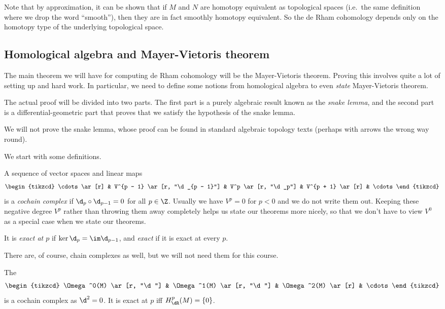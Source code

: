 \documentclass[a4paper]{article}
\begin{document}
Note that by approximation, it can be shown that if $M$ and $N$ are homotopy equivalent as topological spaces (i.e.\ the same definition where we drop the word ``smooth''), then they are in fact smoothly homotopy equivalent. So the de Rham cohomology depends only on the homotopy type of the underlying topological space.

\subsection{Homological algebra and Mayer-Vietoris theorem}
The main theorem we will have for computing de Rham cohomology will be the Mayer-Vietoris theorem. Proving this involves quite a lot of setting up and hard work. In particular, we need to define some notions from homological algebra to even \emph{state} Mayer-Vietoris theorem.

The actual proof will be divided into two parts. The first part is a purely algebraic result known as the \emph{snake lemma}, and the second part is a differential-geometric part that proves that we satisfy the hypothesis of the snake lemma.

We will not prove the snake lemma, whose proof can be found in standard algebraic topology texts (perhaps with arrows the wrong way round). %

We start with some definitions.
\begin{defi}
  A sequence of vector spaces and linear maps
  \[
    \begin{tikzcd}
      \cdots \ar[r] & V^{p - 1} \ar[r, "\d_{p - 1}"] & V^p \ar[r, "\d_p"] & V^{p + 1} \ar[r] & \cdots
    \end{tikzcd}
  \]
  is a \emph{cochain complex} if $\d_p \circ \d_{p - 1} = 0$ for all $p \in \Z$. Usually we have $V^p = 0$ for $p < 0$ and we do not write them out. Keeping these negative degree $V^p$ rather than throwing them away completely helps us state our theorems more nicely, so that we don't have to view $V^0$ as a special case when we state our theorems.

  It is \emph{exact at $p$} if $\ker \d_p = \im \d_{p - 1}$, and \emph{exact} if it is exact at every $p$.
\end{defi}
There are, of course, chain complexes as well, but we will not need them for this course.

\begin{eg}
  The 
  \[
    \begin{tikzcd}
      \Omega^0(M) \ar[r, "\d"] & \Omega^1(M) \ar[r, "\d"] & \Omega^2(M) \ar[r] & \cdots
    \end{tikzcd}
  \]
  is a cochain complex as $\d^2 = 0$. It is exact at $p$ iff $H_{\dR}^p(M) = \{0\}$.
\end{eg}
\end{document}

